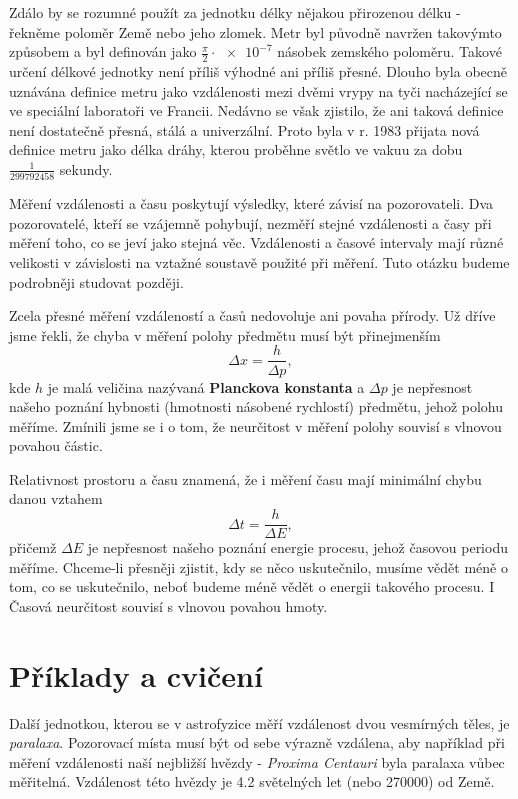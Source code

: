    Zdálo by se rozumné použít za jednotku délky nějakou přirozenou délku - řekněme poloměr Země 
    nebo jeho zlomek. Metr byl původně navržen takovýmto způsobem a byl definován jako 
    \(\frac{\pi}{2}\cdot\num{e-7}\) násobek zemského poloměru. Takové určení délkové jednotky není 
    příliš výhodné ani příliš přesné. Dlouho byla obecně uznávána definice metru jako vzdálenosti 
    mezi dvěmi vrypy na tyči nacházející se ve speciální laboratoři ve Francii. Nedávno se však 
    zjistilo, že ani taková definice není dostatečně přesná, stálá a univerzální. Proto byla v r. 
    1983 přijata nová definice metru jako délka dráhy, kterou proběhne světlo ve vakuu za dobu 
    \(\frac{\num{1}}{\num{299792458}}\) sekundy.
    
    Měření vzdálenosti a času poskytují výsledky, které závisí na pozorovateli. Dva pozorovatelé, 
    kteří se vzájemně pohybují, nezměří stejné vzdálenosti a časy při měření toho, co se jeví jako 
    stejná věc. Vzdálenosti a časové intervaly mají různé velikosti v závislosti na vztažné 
    soustavě použité při měření. Tuto otázku budeme podrobněji studovat později.
    
    Zcela přesné měření vzdáleností a časů nedovoluje ani povaha přírody. Už dříve jsme řekli, že 
    chyba v měření polohy předmětu musí být přinejmenším
    \begin{equation}\label{fyz:eq067}
      \Delta x = \frac{h}{\Delta p},
    \end{equation}
    kde \(h\) je malá veličina nazývaná \textbf{Planckova konstanta} a \(\Delta p\) je nepřesnost 
    našeho poznání hybnosti (hmotnosti násobené rychlostí) předmětu, jehož polohu měříme. Zmínili 
    jsme se i o tom, že neurčitost v měření polohy souvisí s vlnovou povahou částic.
    
    Relativnost prostoru a času znamená, že i měření času mají minimální chybu danou vztahem
    \begin{equation}\label{fyz:eq068}
      \Delta t = \frac{h}{\Delta E},
    \end{equation}
    přičemž \(\Delta E\) je nepřesnost našeho poznání energie procesu, jehož časovou periodu 
    měříme. Chceme-li přesněji zjistit, kdy se něco uskutečnilo, musíme vědět méně o tom, co se 
    uskutečnilo, neboť budeme méně vědět o energii takového procesu. I Časová neurčitost souvisí s 
    vlnovou povahou hmoty.

    \section{Příklady a cvičení}
      
      Další jednotkou, kterou se v astrofyzice měří vzdálenost dvou vesmírných těles, je 
      \emph{paralaxa}. Pozorovací místa musí být od sebe výrazně vzdálena, aby například při měření 
      vzdálenosti naší nejbližší hvězdy - \emph{Proxima Centauri} byla paralaxa vůbec měřitelná. 
      Vzdálenost této hvězdy je \num{4.2} světelných let (nebo \SI{270000}{\AU}) od Země.
        
